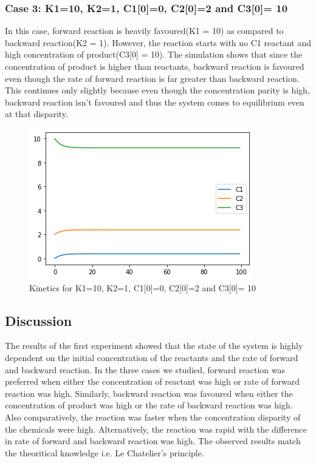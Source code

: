 \documentclass[10pt,journal,cspaper,compsoc]{IEEEtran}
\begin{document}
    \subsubsection*{Case 3: K1=10, K2=1, C1[0]=0, C2[0]=2 and C3[0]= 10}
    In this case, forward reaction is heavily favoured(K1 = 10) as compared to backward reaction(K2 = 1).
    However, the reaction starts with no C1 reactant and high concentration of product(C3[0] = 10). 
    The simulation shows that since the concentration of product is higher than reactants, backward reaction is favoured even though the rate of forward reaction is far greater than backward reaction. 
    This continues only slightly because even though the concentration parity is high, backward reaction isn't favoured and thus the system comes to equilibrium even at that disparity.
    \begin{figure}[h!]
      \centering
      \includegraphics[scale = 0.5]{images/Exp1_Example3.png}
      \caption{Kinetics for K1=10, K2=1, C1[0]=0, C2[0]=2 and C3[0]= 10}
    \end{figure}
    \subsection{Discussion}
    The results of the first experiment showed that the state of the system is highly dependent on the initial concentration of the reactants and the rate of forward and backward reaction.
    In the three cases we studied, forward reaction was preferred when either the concentration of reactant was high or rate of forward reaction was high.
    Similarly, backward reaction was favoured when either the concentration of product was high or the rate of backward reaction was high. 
    Also comparatively, the reaction was faster when the concentration disparity of the chemicals were high.
    Alternatively, the reaction was rapid with the difference in rate of forward and backward reaction was high.
    The observed results match the theoritical knowledge i.e. Le Chatelier's principle.
\end{document}
